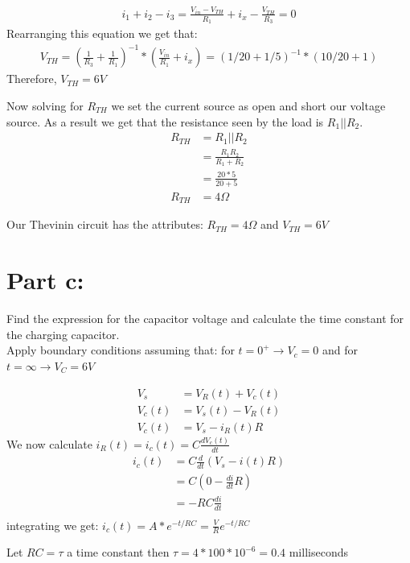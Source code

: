 \documentclass{article}
\begin{document}
\begin{align*}
i_1 + i_2 - i_3 = \frac{V_{in} - V_{TH}}{R_1} + i_x - \frac{V_{TH}}{R_3} = 0
\end{align*}
Rearranging this equation we get that:
\begin{align*}
V_{TH} = (\frac{1}{R_3}+\frac{1}{R_1})^{-1}*(\frac{V_{in}}{R_1} + i_x) = (1/20 + 1/5)^{-1} * (10/20 + 1) 
\end{align*}
Therefore, $V_{TH} = 6V$

Now solving for $R_{TH}$ we set the current source as open and short our voltage source. As a result we get that the resistance seen by the load is $R_1 || R_2$.
\begin{align*}
R_{TH} & = R_1 || R_2 \\
 &= \frac{R_1 R_2}{R_1 + R_2} \\ 
 &= \frac{20*5}{20+5} \\
R_{TH} &= 4 \Omega
\end{align*}

Our Thevinin circuit has the attributes: $R_{TH}=4 \Omega $ and $V_{TH}=6V$

\section*{Part c:}
Find the expression for the capacitor voltage and calculate the time constant for the charging capacitor. \\

Apply boundary conditions assuming that: for $t=0^+ \rightarrow V_c=0$ and for $t=\infty \rightarrow V_C=6V$

\begin{align*} 
    V_s &= V_R(t) + V_c(t) \\ 
    V_c(t) &= V_s(t) - V_R(t) \\
    V_c(t) &= V_s - i_R(t)R 
\end{align*}
We now calculate $i_R(t) = i_c(t) = C \frac{dV_c(t)}{dt}$ 
\begin{align*}
    i_c(t) & = C \frac{d}{dt} (V_s -i(t)R) \\
     & = C(0- \frac{di}{dt}R) \\
     & = - RC \frac{di}{dt} \\
\end{align*}
integrating we get: $i_c(t) = A*e^{-t/RC} = \frac{V}{R} e^{-t/RC}$

Let $RC = \tau$  a time constant then $\tau = 4 * 100*10^{-6} = 0.4$  milliseconds
\end{document}
